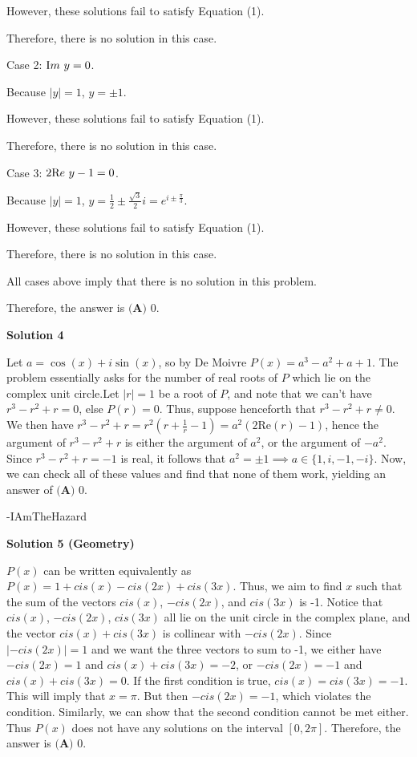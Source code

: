 \begin{enumerate}
 However, these solutions fail to satisfy Equation (1).

 Therefore, there is no solution in this case.

 Case 2: ${\textrm Im} \ y = 0$.

 Because $|y| = 1$, $y = \pm 1$.

 However, these solutions fail to satisfy Equation (1).

 Therefore, there is no solution in this case.

 Case 3: $2 {\textrm Re} \ y - 1 = 0$.

 Because $|y| = 1$, $y = \frac{1}{2} \pm \frac{\sqrt{3}}{2} i = e^{i \pm \frac{\pi}{3}}$.

 However, these solutions fail to satisfy Equation (1).

 Therefore, there is no solution in this case.

 All cases above imply that there is no solution in this problem.

 Therefore, the answer is $\boxed{\textbf{(A) }0}$.

 



\textbf{Solution 4}

Let $a=\cos(x)+i\sin(x)$, so by De Moivre $P(x)=a^3-a^2+a+1$. The problem essentially asks for the number of real roots of $P$ which lie on the complex unit circle.Let $|r|=1$ be a root of $P$, and note that we can't have $r^3-r^2+r=0$, else $P(r)=0$. Thus, suppose henceforth that $r^3-r^2+r \neq 0$. We then have $r^3-r^2+r=r^2(r+\frac{1}{r}-1)=a^2(2\mathrm{Re}(r)-1)$, hence the argument of $r^3-r^2+r$ is either the argument of $a^2$, or the argument of $-a^2$. Since $r^3-r^2+r=-1$ is real, it follows that $a^2=\pm 1 \implies a \in \{1,i,-1,-i\}$. Now, we can check all of these values and find that none of them work, yielding an answer of $\boxed{\textbf{(A) }0}$.

 -IAmTheHazard

 



\textbf{Solution 5 (Geometry)}

$P(x)$ can be written equivalently as $P(x) = 1 + cis(x) - cis(2x) + cis(3x).$ Thus, we aim to find $x$ such that the sum of the vectors $cis(x)$, $-cis(2x)$, and $cis(3x)$ is -1. Notice that $cis(x)$, $-cis(2x)$, $cis(3x)$ all lie on the unit circle in the complex plane, and the vector $cis(x) + cis(3x)$ is collinear with $-cis(2x).$ Since $|-cis(2x)| = 1$ and we want the three vectors to sum to -1, we either have $-cis(2x) = 1$ and $cis(x) + cis(3x) = -2$, or $-cis(2x) = -1$ and $cis(x) + cis(3x) = 0.$ If the first condition is true, $cis(x) = cis(3x)=-1.$ This will imply that $x= \pi.$ But then $-cis(2x) = -1$, which violates the condition. Similarly, we can show that the second condition cannot be met either. Thus $P(x)$ does not have any solutions on the interval $[0, 2\pi].$ Therefore, the answer is $\boxed{\textbf{(A) }0}$.


\end{enumerate}
